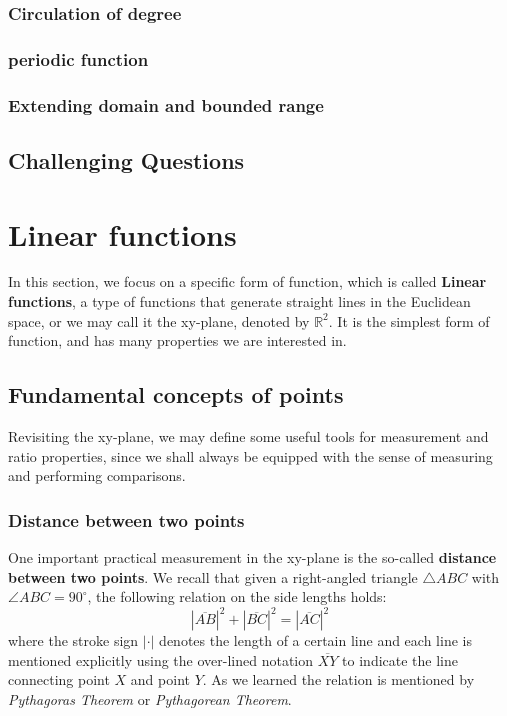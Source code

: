 \documentclass[12pt]{article}
\begin{document}
    \subsubsection*{Circulation of degree}

    \subsubsection*{periodic function}

    \subsubsection*{Extending domain and bounded range}

    \subsection{Challenging Questions}

    \newpage

    \section{Linear functions}

    In this section, we focus on a specific form of function, which is called \textbf{Linear functions}, a type of functions that generate straight lines in the Euclidean space, or we may call it the xy-plane, denoted by $\mathbb{R}^2$. It is the simplest form of function, and has many properties we are interested in.

    \subsection{Fundamental concepts of points}

    Revisiting the xy-plane, we may define some useful tools for measurement and ratio properties, since we shall always be equipped with the sense of measuring and performing comparisons.

    \subsubsection*{Distance between two points}

    One important practical measurement in the xy-plane is the so-called \textbf{distance between two points}. We recall that given a right-angled triangle $\triangle ABC$ with $\angle ABC = 90^\circ$, the following relation on the side lengths holds: $$|\overline{AB}|^2+|\overline{BC}|^2=|\overline{AC}|^2$$ where the stroke sign $|\cdot|$ denotes the length of a certain line and each line is mentioned explicitly using the over-lined notation $\overline{XY}$ to indicate the line connecting point $X$ and point $Y$. As we learned the relation is mentioned by \textit{Pythagoras Theorem} or \textit{Pythagorean Theorem}.
    
\end{document}
